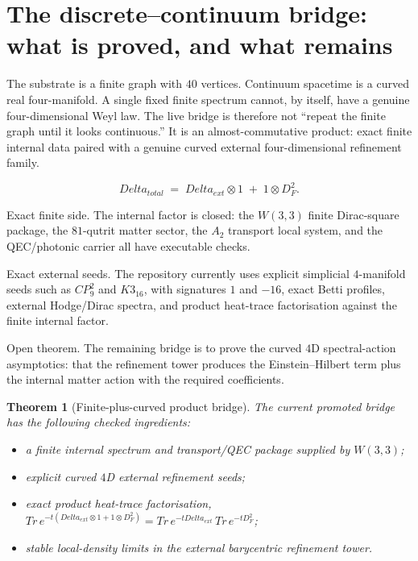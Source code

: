 \documentclass[11pt]{article}
\def\mathbb#1{#1}%
\def\mathrm#1{#1}%
\def\textbf#1{#1}%
\def\Delta{Delta}%
\newtheorem*{theorem}{Theorem}
\begin{document}
\section{The discrete--continuum bridge: what is proved, and what remains}

\label{sec:continuum-limit}

The substrate is a finite graph with $40$ vertices. Continuum spacetime is a curved real four-manifold. A single fixed finite spectrum cannot, by itself, have a genuine four-dimensional Weyl law. The live bridge is therefore not ``repeat the finite graph until it looks continuous.'' It is an \textbf{almost-commutative product}: exact finite internal data paired with a genuine curved external four-dimensional refinement family.

\[
\Delta_{\mathrm{total}}
\;=\;
\Delta_{\mathrm{ext}}\otimes 1
\;+\;
1\otimes D_F^2 .
\]

\begin{statusbox}
\textbf{Exact finite side.} The internal factor is closed: the $W(3,3)$ finite Dirac-square package, the $81$-qutrit matter sector, the $A_2$ transport local system, and the QEC/photonic carrier all have executable checks.

\textbf{Exact external seeds.} The repository currently uses explicit simplicial $4$-manifold seeds such as $\mathbb{CP}^2_9$ and $K3_{16}$, with signatures $1$ and $-16$, exact Betti profiles, external Hodge/Dirac spectra, and product heat-trace factorisation against the finite internal factor.

\textbf{Open theorem.} The remaining bridge is to prove the curved $4$D spectral-action asymptotics: that the refinement tower produces the Einstein--Hilbert term plus the internal matter action with the required coefficients.
\end{statusbox}

\begin{theorem}[Finite-plus-curved product bridge]
The current promoted bridge has the following checked ingredients:
\begin{itemize}[leftmargin=2em]
\item a finite internal spectrum and transport/QEC package supplied by $W(3,3)$;
\item explicit curved $4$D external refinement seeds;
\item exact product heat-trace factorisation, $\mathrm{Tr}\,e^{-t(\Delta_{\mathrm{ext}}\otimes1+1\otimes D_F^2)}
=
\mathrm{Tr}\,e^{-t\Delta_{\mathrm{ext}}}\,\mathrm{Tr}\,e^{-tD_F^2}$;
\item stable local-density limits in the external barycentric refinement tower.
\end{itemize}
\end{theorem}
\end{document}

